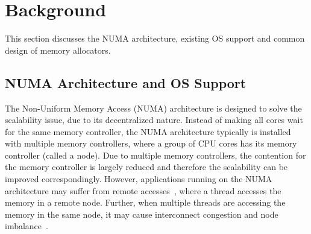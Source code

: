 \section{Background}
\label{sec:background}

This section discusses the NUMA architecture, existing OS support and common design of memory allocators.

\subsection{NUMA Architecture and OS Support}

\label{sec:numa}


The Non-Uniform Memory Access (NUMA) architecture is designed to solve the scalability issue, due to its decentralized nature. Instead of making all cores wait for the same memory controller, the NUMA architecture typically is installed with multiple memory controllers, where a group of CPU cores has its memory controller (called a node). 
Due to multiple memory controllers, the contention for the memory controller is largely reduced and therefore the scalability can be improved correspondingly. However, applications running on the NUMA architecture may suffer from remote accesses~\cite{Blagodurov:2011:CNC:2002181.2002182}, where a thread accesses the memory in a remote node. Further, when multiple threads are accessing the memory in the same node, it may cause interconnect congestion and node imbalance~\cite{Blagodurov:2011:CNC:2002181.2002182}.  

 
